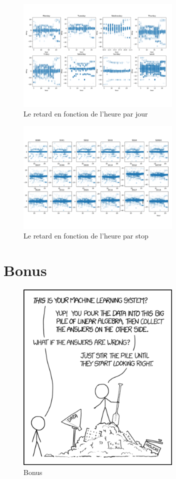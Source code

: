 \begin{appendices}
    \begin{figure}[ht]
        \centering
        \includegraphics[width=0.7\textwidth]{images/delay_day.png}
        \caption{Le retard en fonction de l'heure par jour}
        \label{appendix:delay_day}
    \end{figure}

    \begin{figure}[ht]
        \centering
        \includegraphics[width=0.7\textwidth]{images/delay_stop.png}
        \caption{Le retard en fonction de l'heure par stop}
        \label{appendix:delay_stop}
    \end{figure}

    \chapter{Bonus}
    \begin{figure}[ht]
        \centering
        \includegraphics[width=0.7\textwidth]{images/bonus.png}
        \caption{Bonus}
        \label{appendix:bonus}
    \end{figure}

\end{appendices}